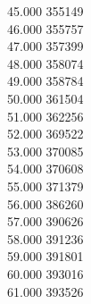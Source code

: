 { 45.000	355149 \\
 46.000	355757 \\
 47.000	357399 \\
 48.000	358074 \\
 49.000	358784 \\
 50.000	361504 \\
 51.000	362256 \\
 52.000	369522 \\
 53.000	370085 \\
 54.000	370608 \\
 55.000	371379 \\
 56.000	386260 \\
 57.000	390626 \\
 58.000	391236 \\
 59.000	391801 \\
 60.000	393016 \\
 61.000	393526 \\
}
